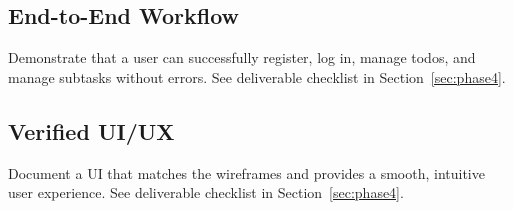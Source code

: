 \newpage
\subsection{End-to-End Workflow}\label{sec:e2e-workflow}
Demonstrate that a user can successfully register, log in, manage todos, and manage subtasks without errors.
See deliverable checklist in Section~\ref{sec:phase4}.

\newpage
\subsection{Verified UI/UX}\label{sec:verified-ui}
Document a UI that matches the wireframes and provides a smooth, intuitive user experience.
See deliverable checklist in Section~\ref{sec:phase4}.

\newpage
